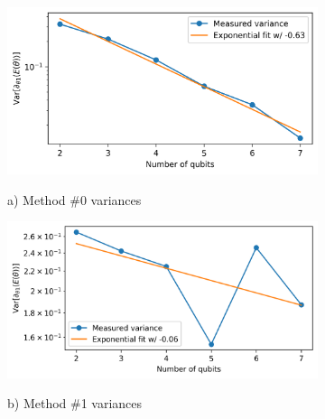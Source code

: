 \begin{figure}
    \centering
    \begin{subfigure}[b]{.49\textwidth}
        \includegraphics[width=\textwidth]{Artefact/Appendices/var0.png}
        \centerline{a) Method \#0 variances}
    \end{subfigure}
    \hfill
    \begin{subfigure}[b]{.49\textwidth}
        \includegraphics[width=\textwidth]{Artefact/Appendices/var1.png}
        \centerline{b) Method \#1 variances}
    \end{subfigure}


\end{figure}
